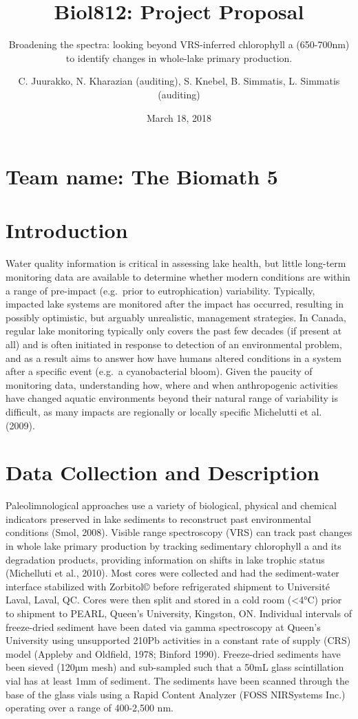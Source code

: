 \documentclass[]{article}
\title{Biol812: Project Proposal}
\subtitle{Broadening the spectra: looking beyond VRS-inferred chlorophyll a
(650-700nm) to identify changes in whole-lake primary production.}
\author{C. Juurakko, N. Kharazian (auditing), S. Knebel, B. Simmatis, L.
Simmatis (auditing)}
\date{March 18, 2018}
\begin{document}
\maketitle

\section{Team name: The Biomath 5}\label{team-name-the-biomath-5}

\section{Introduction}\label{introduction}

Water quality information is critical in assessing lake health, but
little long-term monitoring data are available to determine whether
modern conditions are within a range of pre-impact (e.g.~prior to
eutrophication) variability. Typically, impacted lake systems are
monitored after the impact has occurred, resulting in possibly
optimistic, but arguably unrealistic, management strategies. In Canada,
regular lake monitoring typically only covers the past few decades (if
present at all) and is often initiated in response to detection of an
environmental problem, and as a result aims to answer how have humans
altered conditions in a system after a specific event (e.g.~a
cyanobacterial bloom). Given the paucity of monitoring data,
understanding how, where and when anthropogenic activities have changed
aquatic environments beyond their natural range of variability is
difficult, as many impacts are regionally or locally specific Michelutti
et al. (2009).

\section{Data Collection and
Description}\label{data-collection-and-description}

Paleolimnological approaches use a variety of biological, physical and
chemical indicators preserved in lake sediments to reconstruct past
environmental conditions (Smol, 2008). Visible range spectroscopy (VRS)
can track past changes in whole lake primary production by tracking
sedimentary chlorophyll a and its degradation products, providing
information on shifts in lake trophic status (Michelluti et al., 2010).
Most cores were collected and had the sediment-water interface
stabilized with Zorbitol© before refrigerated shipment to Université
Laval, Laval, QC. Cores were then split and stored in a cold room
(\textless{}4°C) prior to shipment to PEARL, Queen's University,
Kingston, ON. Individual intervals of freeze-dried sediment have been
dated via gamma spectroscopy at Queen's University using unsupported
210Pb activities in a constant rate of supply (CRS) model (Appleby and
Oldfield, 1978; Binford 1990). Freeze-dried sediments have been sieved
(120µm mesh) and sub-sampled such that a 50mL glass scintillation vial
has at least 1mm of sediment. The sediments have been scanned through
the base of the glass vials using a Rapid Content Analyzer (FOSS
NIRSystems Inc.) operating over a range of 400-2,500 nm.
\end{document}
